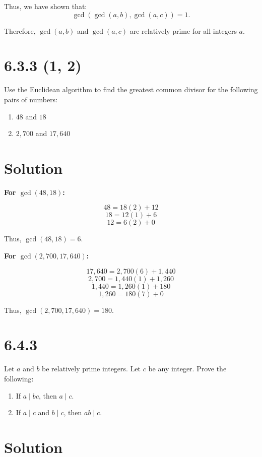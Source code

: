 \documentclass{article}
\begin{document}
Thus, we have shown that:
\[
\gcd(\gcd(a, b), \gcd(a, c)) = 1.
\]

Therefore, \( \gcd(a, b) \) and \( \gcd(a, c) \) are relatively prime for all integers \( a \).


\medskip

\section*{6.3.3 (1, 2)}
Use the Euclidean algorithm to find the greatest common divisor for the following pairs of numbers:

\begin{enumerate}
    \item \( 48 \) and \( 18 \)
    \item \( 2,700 \) and \( 17,640 \)
\end{enumerate}

\section*{Solution}

\textbf{For \(\gcd(48, 18)\):}

\[
48 = 18(2) + 12
\]
\[
18 = 12(1) + 6
\]
\[
12 = 6(2) + 0
\]

Thus, \(\gcd(48, 18) = 6\).

\medskip

\textbf{For \(\gcd(2,700, 17,640)\):}

\[
17,640 = 2,700(6) + 1,440
\]
\[
2,700 = 1,440(1) + 1,260
\]
\[
1,440 = 1,260(1) + 180
\]
\[
1,260 = 180(7) + 0
\]

Thus, \(\gcd(2,700, 17,640) = 180\).

\medskip


\section*{6.4.3}
Let \( a \) and \( b \) be relatively prime integers. Let \( c \) be any integer. Prove the following:

\begin{enumerate}
    \item If \( a \mid bc \), then \( a \mid c \).
    \item If \( a \mid c \) and \( b \mid c \), then \( ab \mid c \).
\end{enumerate}

\section*{Solution}
\end{document}
